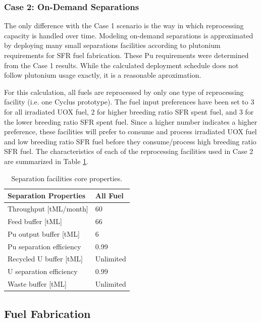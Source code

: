 \documentclass[12pt]{article}
\begin{document}
\subsubsection{Case 2: On-Demand Separations}
\label{sec:case2}

The only difference with the Case 1 scenario is the way in
which reprocessing capacity is handled over time.  Modeling on-demand
separations is approximated by deploying many small separations facilities according to plutonium
requirements for SFR fuel fabrication.  These Pu requirements were determined
from the Case 1 results. While the calculated deployment schedule does not
follow plutonium usage exactly, it is a reasonable aproximation. 

For this calculation, all fuels are reprocessed by only one type of
reprocessing facility (i.e. one Cyclus prototype). The fuel input preferences
have been set to 3 for all irradiated UOX fuel, 2 for higher breeding ratio
SFR spent fuel, and 3 for the lower breeding ratio SFR spent fuel.  Since a higher
number indicates a higher preference, these facilities will prefer to consume and process
irradiated UOX fuel and low breeding ratio SFR fuel before they consume/process 
high breeding ratio SFR fuel.  The characteristics of each of the
reprocessing facilities used in Case 2 are summarized in Table
\ref{tab:fuelfab_2}.

\begin{table}[h!]
    \centering
    \begin{tabular}{ll}
    \hline
    Separation Properties	&	All Fuel	\\
    \hline
    Throughput [tML/month]	&	60		\\
    Feed buffer [tML]		&	66		\\
    Pu output buffer  [tML]	&	6		\\
    Pu separation efficiency	&	0.99		\\
    Recycled U buffer [tML]	&	Unlimited	\\
    U separation efficiency	&	0.99		\\
    Waste buffer [tML]		&	Unlimited	\\
    \hline
    \end{tabular}
    \caption{Separation facilities core properties.}
    \label{tab:fuelfab_2}
\end{table}

\subsection{Fuel Fabrication}
\end{document}
